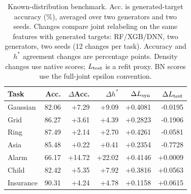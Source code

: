 \begin{table}[ht]
\centering
{\small
\setlength{\tabcolsep}{2pt}
\begin{tabular}{lrrrrr}
\toprule
Task & Acc. & $\Delta$Acc. & $\Delta h^*$ & $\Delta L_{\rm syn}$ & $\Delta L_{\rm test}$ \\
\midrule
Gaussian & 82.06 & +7.29 & +9.09 & +0.4081 & -0.0195 \\
Grid & 86.27 & +3.61 & +4.39 & +0.2823 & -0.1906 \\
Ring & 87.49 & +2.14 & +2.70 & +0.4261 & -0.0581 \\
Asia & 85.48 & +0.22 & +0.41 & +0.2354 & -0.7728 \\
Alarm & 66.17 & +14.72 & +22.02 & +0.4146 & +0.0009 \\
Child & 82.42 & +5.35 & +7.92 & +0.3816 & +0.0563 \\
Insurance & 90.31 & +4.24 & +4.78 & +0.1158 & +0.0615 \\
\bottomrule
\end{tabular}
}
\caption{Known-distribution benchmark. Acc. is generated-target accuracy (\%), averaged over two generators and two seeds. Changes compare joint relabeling on the same features with generated targets: RF/XGB/DNN, two generators, two seeds (12 changes per task). Accuracy and $h^*$ agreement changes are percentage points. Density changes use native scores; $L_{\rm test}$ is a refit proxy. BN scores use the full-joint epsilon convention.}
\label{tab:oracle}
\end{table}
